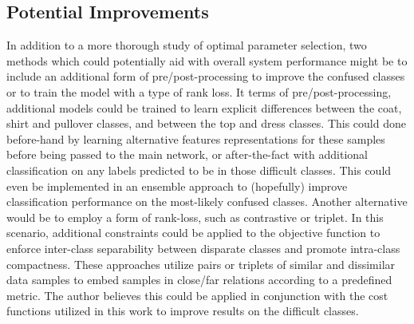 \documentclass[conference]{IEEEtran}
\begin{document}
\subsection{Potential Improvements}
In addition to a more thorough study of optimal parameter selection, two methods which could potentially aid with overall system performance might be to include an additional form of pre/post-processing to improve the confused classes or to train the model with a type of rank loss.  It terms of pre/post-processing, additional models could be trained to learn explicit differences between the coat, shirt and  pullover classes, and between the top and dress classes.  This could done before-hand by learning alternative  features representations for these samples before being passed to the main network, or after-the-fact with additional classification on any labels predicted to be in those difficult classes.  This could even be implemented in an ensemble approach to (hopefully) improve classification performance on the most-likely confused classes.  Another alternative  would be to employ a form of rank-loss, such as contrastive or triplet.  In this scenario, additional constraints could be applied to the objective function to enforce inter-class separability between disparate classes and promote intra-class compactness.  These approaches utilize pairs or triplets of similar and  dissimilar data samples to embed samples  in close/far relations according to a predefined metric.  The author believes this could be applied  in conjunction with the cost functions utilized in this work to improve results on the difficult classes.




\end{document}

